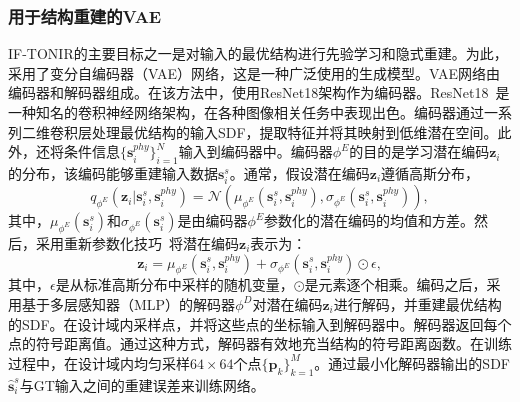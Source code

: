 \subsubsection{用于结构重建的VAE}
IF-TONIR的主要目标之一是对输入的最优结构进行先验学习和隐式重建。为此，采用了变分自编码器（VAE）网络，这是一种广泛使用的生成模型。VAE网络由编码器和解码器组成。在该方法中，使用ResNet18架构作为编码器。ResNet18~\cite{he2016deep}是一种知名的卷积神经网络架构，在各种图像相关任务中表现出色。编码器通过一系列二维卷积层处理最优结构的输入SDF，提取特征并将其映射到低维潜在空间。此外，还将条件信息$\{\mathbf{s}^{phy}_i\}_{i=1}^N$输入到编码器中。编码器$\phi^E$的目的是学习潜在编码$\mathbf{z}_i$的分布，该编码能够重建输入数据$\mathbf{s}^s_i$。通常，假设潜在编码$\mathbf{z}_i$遵循高斯分布，
\begin{equation}
    q_{\phi^E}(\mathbf{z}_i|\mathbf{s}^s_i,\mathbf{s}^{phy}_i) = \mathcal{N}(\mu_{\phi^E}(\mathbf{s}^s_i,\mathbf{s}^{phy}_i),\sigma_{\phi^E}(\mathbf{s}^s_i,\mathbf{s}^{phy}_i)),
\end{equation}
其中，$\mu_{\phi^E}(\mathbf{s}^s_i)$和$\sigma_{\phi^E}(\mathbf{s}^s_i)$是由编码器$\phi^E$参数化的潜在编码的均值和方差。然后，采用重新参数化技巧~\cite{kingma2019introduction}将潜在编码$\mathbf{z}_i$表示为：
\begin{equation}
    \mathbf{z}_i = \mu_{\phi^E}(\mathbf{s}^s_i,\mathbf{s}^{phy}_i) + \sigma_{\phi^E}(\mathbf{s}^s_i,\mathbf{s}^{phy}_i) \odot \epsilon,
\end{equation}
其中，$\epsilon$是从标准高斯分布中采样的随机变量，$\odot$是元素逐个相乘。编码之后，采用基于多层感知器（MLP）的解码器$\phi^D$对潜在编码$\mathbf{z}_i$进行解码，并重建最优结构的SDF。在设计域内采样点，并将这些点的坐标输入到解码器中。解码器返回每个点的符号距离值。通过这种方式，解码器有效地充当结构的符号距离函数。在训练过程中，在设计域内均匀采样$64\times 64$个点$\{\mathbf{p}_k\}_{k=1}^M$。通过最小化解码器输出的SDF $\hat{\mathbf{s}}^s_i$与GT输入之间的重建误差来训练网络。

